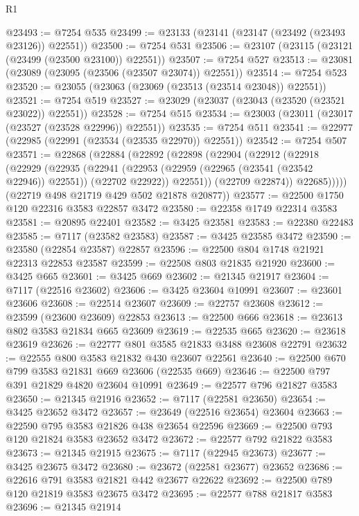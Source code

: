 \begin{lexlean}{R1}
\begin{coremodule}
@23493 := @7254 @535
@23499 := @23133 (@23141 (@23147 (@23492 (@23493 @23126)) @22551))
@23500 := @7254 @531
@23506 := @23107 (@23115 (@23121 (@23499 (@23500 @23100)) @22551))
@23507 := @7254 @527
@23513 := @23081 (@23089 (@23095 (@23506 (@23507 @23074)) @22551))
@23514 := @7254 @523
@23520 := @23055 (@23063 (@23069 (@23513 (@23514 @23048)) @22551))
@23521 := @7254 @519
@23527 := @23029 (@23037 (@23043 (@23520 (@23521 @23022)) @22551))
@23528 := @7254 @515
@23534 := @23003 (@23011 (@23017 (@23527 (@23528 @22996)) @22551))
@23535 := @7254 @511
@23541 := @22977 (@22985 (@22991 (@23534 (@23535 @22970)) @22551))
@23542 := @7254 @507
@23571 := @22868
    (@22884
      (@22892
        (@22898
          (@22904
            (@22912
              (@22918
                (@22929
                  (@22935
                    (@22941
                      (@22953 (@22959 (@22965 (@23541 (@23542 @22946)) @22551)) (@22702 @22922))
                      @22551))
                  (@22709 @22874))
                @22685)))))
      (@22719 @498 @21719 @429 @502 @21878 @20877))
@23577 := @22500 @1750 @120 @22316 @3583 @22857 @3472
@23580 := @22358 @1749 @22314 @3583
@23581 := @20895 @22401
@23582 := @3425 @23581
@23583 := @22380 @22483
@23585 := @7117 (@23582 @23583)
@23587 := @3425 @23585 @3472
@23590 := @23580 (@22854 @23587) @22857
@23596 := @22500 @804 @1748 @21921 @22313 @22853 @23587
@23599 := @22508 @803 @21835 @21920
@23600 := @3425 @665
@23601 := @3425 @669
@23602 := @21345 @21917
@23604 := @7117 (@22516 @23602)
@23606 := @3425 @23604 @10991
@23607 := @23601 @23606
@23608 := @22514 @23607
@23609 := @22757 @23608
@23612 := @23599 (@23600 @23609) @22853
@23613 := @22500 @666
@23618 := @23613 @802 @3583 @21834 @665 @23609
@23619 := @22535 @665
@23620 := @23618 @23619
@23626 := @22777 @801 @3585 @21833 @3488 @23608 @22791
@23632 := @22555 @800 @3583 @21832 @430 @23607 @22561
@23640 := @22500 @670 @799 @3583 @21831 @669 @23606 (@22535 @669)
@23646 := @22500 @797 @391 @21829 @4820 @23604 @10991
@23649 := @22577 @796 @21827 @3583
@23650 := @21345 @21916
@23652 := @7117 (@22581 @23650)
@23654 := @3425 @23652 @3472
@23657 := @23649 (@22516 @23654) @23604
@23663 := @22590 @795 @3583 @21826 @438 @23654 @22596
@23669 := @22500 @793 @120 @21824 @3583 @23652 @3472
@23672 := @22577 @792 @21822 @3583
@23673 := @21345 @21915
@23675 := @7117 (@22945 @23673)
@23677 := @3425 @23675 @3472
@23680 := @23672 (@22581 @23677) @23652
@23686 := @22616 @791 @3583 @21821 @442 @23677 @22622
@23692 := @22500 @789 @120 @21819 @3583 @23675 @3472
@23695 := @22577 @788 @21817 @3583
@23696 := @21345 @21914

\end{coremodule}
\end{lexlean}
